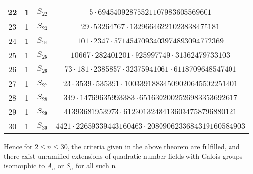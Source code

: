 \documentclass[12pt]{extarticle}
\newcommand{\<}{\langle}
\renewcommand{\>}{\rangle}
\theoremstyle{definition}
\begin{document}
\begin{center}
\begin{tabular}{||c | c | c | c||}
\hline
22 & 1 & $S_{22}$ & $5 \cdot 69454092876521107983605569601$ \\
\hline
23 & 1 & $S_{23}$ & $29 \cdot 53264767 \cdot 13296646221023838475181$ \\
\hline
24 & 1 & $S_{24}$ & $101 \cdot 2347 \cdot 5714547093403974893094772369$ \\
\hline
25 & 1 & $S_{25}$ & $10667 \cdot 282401201 \cdot 925997749 \cdot 31362479733103$ \\
\hline
26 & 1 & $S_{26}$ & $73 \cdot 181 \cdot 2385857 \cdot 32375941061 \cdot 6118709648547401$ \\
\hline
27 & 1 & $S_{27}$ & $23 \cdot 3539 \cdot 535391 \cdot 10033918834509020645502251401$ \\
\hline
28 & 1 & $S_{28}$ & $349 \cdot 14769635993383 \cdot 6516302002526983353692617$ \\
\hline
29 & 1 & $S_{29}$ & $41393681953973 \cdot 61230132484136034758796880121$ \\
\hline
30 & 1 & $S_{30}$ & $4421 \cdot 22659339443160463 \cdot 2080906233684319160584903$ \\
\hline


\end{tabular}
\end{center}


Hence for $2 \leq n \leq 30$, the criteria given in the above theorem are fulfilled, and there exist unramified extensions of quadratic number fields with Galois groups isomorphic to $A_n$ or $S_n$ for all such n.  \par
\end{document}
